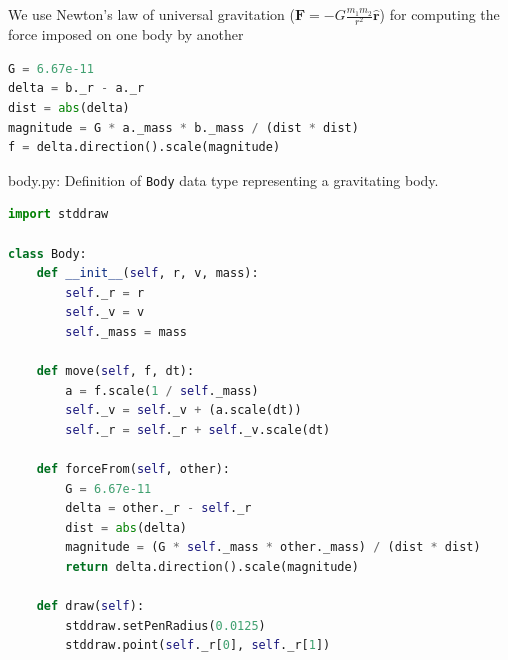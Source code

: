 \documentclass[8pt,a4paper,compress]{beamer}
\begin{document}
\begin{frame}[fragile]
\pause

We use Newton's law of universal gravitation ($\mathbf{F}=-G\frac{m_1m_2}{r^2}\hat{\mathbf{r}}$) for computing the force imposed on one body by another

\begin{lstlisting}[language=python,style=focusin]
G = 6.67e-11
delta = b._r - a._r
dist = abs(delta)
magnitude = G * a._mass * b._mass / (dist * dist)
f = delta.direction().scale(magnitude)
\end{lstlisting}

\begin{center}
\end{center}
\end{frame}

\begin{frame}[fragile]
\pause

\begin{framed}
\tiny body.py: Definition of \lstinline{Body} data type representing a gravitating body.
\end{framed}

\begin{lstlisting}[language=python,style=focusin]
import stddraw

class Body:
    def __init__(self, r, v, mass):
        self._r = r
        self._v = v
        self._mass = mass

    def move(self, f, dt):
        a = f.scale(1 / self._mass)
        self._v = self._v + (a.scale(dt))
        self._r = self._r + self._v.scale(dt)

    def forceFrom(self, other):
        G = 6.67e-11
        delta = other._r - self._r
        dist = abs(delta)
        magnitude = (G * self._mass * other._mass) / (dist * dist)
        return delta.direction().scale(magnitude)

    def draw(self):
        stddraw.setPenRadius(0.0125)
        stddraw.point(self._r[0], self._r[1])
\end{lstlisting}
\end{frame}
\end{document}
